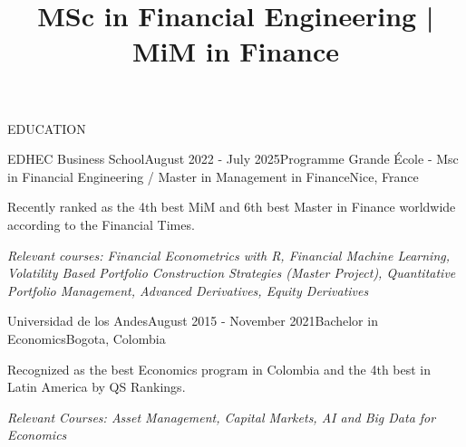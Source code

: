\documentclass{resume} %
\title{MSc in Financial Engineering | MiM in Finance} %
\begin{document}
%
%

\begin{rSection}{EDUCATION}

\begin{rSubsection}{EDHEC Business School}{August 2022 - July 2025}{Programme Grande École - Msc in Financial Engineering / Master in Management in Finance}{Nice, France}
    \item Recently ranked as the 4th best MiM and 6th best Master in Finance worldwide according to the Financial Times.
    \item \textit{Relevant courses: Financial Econometrics with R, Financial Machine Learning, Volatility Based Portfolio Construction Strategies (Master Project), Quantitative Portfolio Management, Advanced Derivatives, Equity Derivatives}
\end{rSubsection}

\begin{rSubsection}{Universidad de los Andes}{August 2015 - November 2021}{Bachelor in Economics}{Bogota, Colombia}
    \item Recognized as the best Economics program in Colombia and the 4th best in Latin America by QS Rankings.
    \item \textit{Relevant Courses: Asset Management, Capital Markets, AI and Big Data for Economics}
\end{rSubsection}

\end{rSection}



%
%
\end{document}

